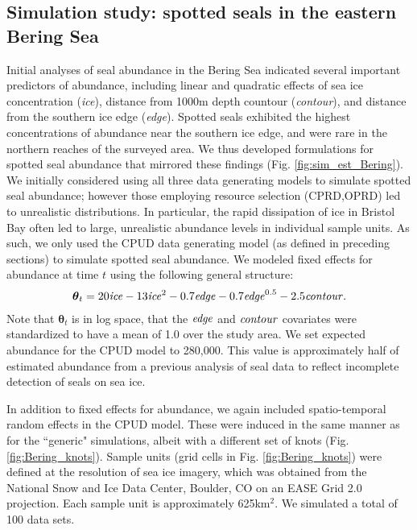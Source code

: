 \documentclass[12pt,fleqn]{article}
\begin{document}
\begin{flushleft}
\section{Simulation study: spotted seals in the eastern Bering Sea}

Initial analyses of seal abundance in the Bering Sea \citep[e.g.,][]{ConnEtAl2014,VerHoefEtAl2014} indicated several important predictors of abundance, including linear and quadratic effects of sea ice concentration ({\it ice}), distance from 1000m depth countour ({\it contour}), and distance from the southern ice edge ({\it edge}).  Spotted seals exhibited the highest concentrations of abundance near the southern ice edge, and were rare in the northern reaches of the surveyed area.  We thus developed formulations for spotted seal abundance that mirrored these findings (Fig. \ref{fig:sim_est_Bering}).  We initially considered using all three data generating models to simulate spotted seal abundance; however those employing resource selection (CPRD,OPRD) led to unrealistic distributions.  In particular, the rapid dissipation of ice in Bristol Bay often led to large, unrealistic abundance levels in individual sample units.  As such, we only used the CPUD data generating model (as defined in preceding sections) to simulate spotted seal abundance.  We modeled fixed effects for abundance at time $t$ using the following general structure:
\begin{eqnarray}
  \label{eq:seal_formula}
  \boldsymbol{\theta}_t = 20 {\it ice} - 13 {\it ice}^2 - 0.7 {\it edge} - 0.7 {\it edge}^{0.5} - 2.5 {\it contour}.
\end{eqnarray}
Note that $\boldsymbol{\theta}_t$ is in log space, that the ${\it edge}$ and ${\it contour}$ covariates were standardized to have a mean of 1.0 over the study area.  We set expected abundance for the CPUD model to 280,000.  This value is approximately half of estimated abundance from a previous analysis of seal data \citep{ConnEtAl2014} to reflect incomplete detection of seals on sea ice.




\hspace{.5in} In addition to fixed effects for abundance, we again included spatio-temporal random effects in the CPUD model.  These were induced in the same manner as for the ``generic" simulations, albeit with a different set of knots (Fig. \ref{fig:Bering_knots}).  Sample units (grid cells in Fig. \ref{fig:Bering_knots}) were defined at the resolution of sea ice imagery, which was obtained from the National Snow and Ice Data Center, Boulder, CO on an EASE Grid 2.0 projection.  Each sample unit is approximately 625km$^2$.  We simulated a total of 100 data sets.



\end{flushleft}
\end{document}
